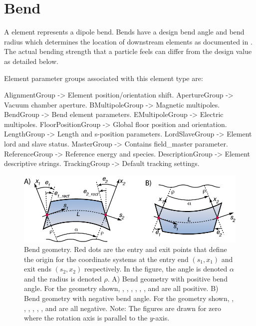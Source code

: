 \newpage

\section{Bend}
\label{s:bend}

A  element represents a dipole bend. Bends have a design bend angle and bend radius
which determines the location of downstream elements as documented in .
The actual bending strength that a particle feels can differ from the design value as detailed
below.

Element parameter groups associated with this element type are:
\TOPrule
\begin{example}
  AlignmentGroup     -> Element position/orientation shift.  
  ApertureGroup      -> Vacuum chamber aperture.  
  BMultipoleGroup    -> Magnetic multipoles.  
  BendGroup          -> Bend element parameters.  
  EMultipoleGroup    -> Electric multipoles.  
  FloorPositionGroup -> Global floor position and orientation.  
  LengthGroup        -> Length and s-position parameters.  
  LordSlaveGroup     -> Element lord and slave status.  
  MasterGroup        -> Contains field_master parameter.  
  ReferenceGroup     -> Reference energy and species.  
  DescriptionGroup   -> Element descriptive strings.  
  TrackingGroup      -> Default tracking settings.  
\end{example}
\BOTTOMrule


\begin{figure}[ht]
  \centering \includegraphics{bend.pdf} 
\caption[Bend geometry]{
Bend geometry. Red dots are the entry and exit points that define the origin for the
coordinate systems at the entry end $(s_1, x_1)$ and exit ends $(s_2, x_2)$ respectively. 
In the figure, the angle  is denoted $\alpha$ and the radius
 is denoted $\rho$.
A) Bend geometry with positive bend angle. For the geometry shown, 
, , , , , , and  are all positive.
B) Bend geometry with negative bend angle. For the geometry shown, 
, , , , , , and  are all negative.
Note: The figures are drawn for zero  where the rotation axis is parallel to the 
$y$-axis. 
}
\label{f:bend2}
\end{figure}

